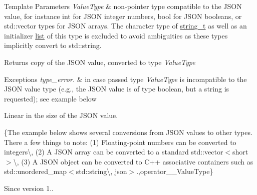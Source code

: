 \begin{DoxyTemplParams}{Template Parameters}
{\em Value\+Type} & non-\/pointer type compatible to the J\+S\+ON value, for instance {\ttfamily int} for J\+S\+ON integer numbers, {\ttfamily bool} for J\+S\+ON booleans, or {\ttfamily std\+::vector} types for J\+S\+ON arrays. The character type of \hyperlink{classnlohmann_1_1basic__json_a33593865ffb1860323dcbd52425b90c8}{string\+\_\+t} as well as an initializer \hyperlink{protocollist-p}{list} of this type is excluded to avoid ambiguities as these types implicitly convert to {\ttfamily std\+::string}.\\
\hline
\end{DoxyTemplParams}
\begin{DoxyReturn}{Returns}
copy of the J\+S\+ON value, converted to type {\itshape Value\+Type} 
\end{DoxyReturn}

\begin{DoxyExceptions}{Exceptions}
{\em type\+\_\+error.} & in case passed type {\itshape Value\+Type} is incompatible to the J\+S\+ON value type (e.\+g., the J\+S\+ON value is of type boolean, but a string is requested); see example below\\
\hline
\end{DoxyExceptions}
Linear in the size of the J\+S\+ON value.

\{The example below shows several conversions from J\+S\+ON values to other types. There a few things to note\+: (1) Floating-\/point numbers can be converted to integers\textbackslash{}, (2) A J\+S\+ON array can be converted to a standard {\ttfamily std\+::vector$<$short$>$}\textbackslash{}, (3) A J\+S\+ON object can be converted to C++ associative containers such as {\ttfamily std\+::unordered\+\_\+map$<$std\+::string\textbackslash{}, json$>$}.,operator\+\_\+\+\_\+\+Value\+Type\}

\begin{DoxySince}{Since}
version 1.. 
\end{DoxySince}
\mbox{\label{classnlohmann_1_1basic__json_a40226d9c84fcb9cb948ae0c27b842c57}} 

